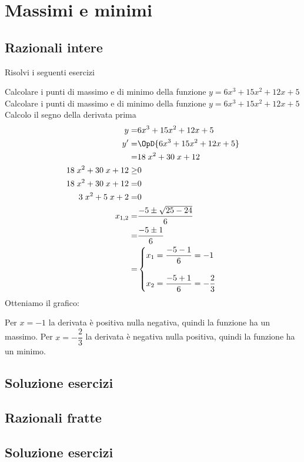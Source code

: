 \chapter{Massimi e minimi}
\section{Razionali intere}
Risolvi i seguenti esercizi
\tcbstartrecording


\begin{exercise}
Calcolare i punti di massimo e di minimo della funzione $y=6x^3+15x^2+12x+5$
	\tcblower
Calcolare i punti di massimo e di minimo della funzione $y=6x^3+15x^2+12x+5$
Calcolo il segno della derivata prima
\begin{align*}
y=&6x^3+15x^2+12x+5\\
y'=&\OpD{6x^3+15x^2+12x+5}\\
=&18 \; x^{2} + 30 \; x + 12\\
18 \; x^{2} + 30 \; x + 12\geq&0\\
18 \; x^{2} + 30 \; x + 12=&0\\
3 \; x^{2} + 5 \; x + 2=&0\\
x_{1,2}=&\dfrac{-5\pm\sqrt{25-24}}{6}\\
=&\dfrac{-5\pm 1}{6}\\
=&\begin{cases}
x_1=\dfrac{-5-1}{6}=-1\\
\\
x_2=\dfrac{-5+1}{6}=-\dfrac{2}{3}\\
\end{cases}
\end{align*}
	Otteniamo il grafico:
\begin{center}
	
\end{center}
Per $x=-1$ la derivata è positiva nulla negativa, quindi la funzione ha un massimo. Per $x=-\dfrac{2}{3}$ la derivata è negativa nulla positiva, quindi la funzione ha un minimo. 
\end{exercise}
\tcbstoprecording
\newpage
\section{Soluzione esercizi}
\tcbinputrecords
\newpage
\section{Razionali fratte}
\tcbstartrecording
\newpage
\section{Soluzione esercizi}
\tcbinputrecords
\newpage